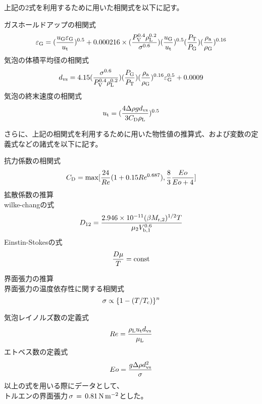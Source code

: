 \documentclass[a4j]{jsreport}
\begin{document}
上記の2式を利用するために用いた相関式を以下に記す。

ガスホールドアップの相関式
\begin{equation}
    \varepsilon_{{\rm G}} = (\frac{u_{{\rm G}}\varepsilon_{{\rm G}}}{u_{{\rm t}}}) ^{0.5} + 0.000216 \times(\frac{P_{{\rm V}}^{0.4} \rho_{{\rm L}}^{0.2} }{ \sigma^{0.6}})(\frac{u_{{\rm G}}}{u_{{\rm t}}})^{0.5}(\frac{P_{{\rm T}}}{P_{{\rm G}}})(\frac{\rho_{{\rm a}}}{\rho_{{\rm G}}})^{0.16}
\end{equation}
気泡の体積平均径の相関式
\begin{equation}
    d_{{\rm vs}} = 4.15 (\frac{\sigma^{0.6}}{P_{{\rm V}}^{0.4} \rho_{{\rm L}}^{0.2}})(\frac{P_{{\rm G}}}{P_{{\rm T}}})(\frac{\rho_{{\rm a}}}{\rho_{{\rm G}}})^{0.16} \varepsilon_{{\rm G}}^{0.5} + 0.0009
\end{equation}
気泡の終末速度の相関式
\begin{equation}
    u_{{\rm t}} = (\frac{4\Delta \rho g d_{{\rm vs}}}{3C_{{\rm D}}\rho_{{\rm L}}})^{0.5}
\end{equation}

さらに、上記の相関式を利用するために用いた物性値の推算式、および変数の定義式などの諸式を以下に記す。

抗力係数の相関式
\begin{equation}
    C_{{\rm D}} = {\rm max}[\frac{24}{Re}(1+0.15Re^{0.687}), \frac{8}{3}\frac{Eo}{Eo+4}]
\end{equation}
拡散係数の推算\\
wilke-changの式
\begin{equation}
    D_{12} = \frac{2.946\times 10^{-11}(\beta M_{{\rm r,2}})^{1/2} T} {\mu_2 V_{{\rm b,1}}^{0.6}}
\end{equation}
Einstin-Stokesの式
\begin{equation}
    \frac{D \mu}{T} = {\rm const}
\end{equation}

界面張力の推算\\
界面張力の温度依存性に関する相関式
\begin{equation}
    \sigma \propto \{1-(T/T_{{\rm c}}) \}^n    
\end{equation}

気泡レイノルズ数の定義式
\begin{equation}
    Re = \frac{\rho_{{\rm L}}u_{{\rm t}}d_{{\rm vs}}}{\mu_{{\rm L}}}
\end{equation}
エトベス数の定義式
\begin{equation}
    Eo = \frac{g \Delta \rho d_{{\rm vs}}^2}{\sigma}
\end{equation}
以上の式を用いる際にデータとして、\\
トルエンの界面張力\,$\sigma\,=\,0.81\,{\rm N\,m^{-2}}$とした。
\end{document}
